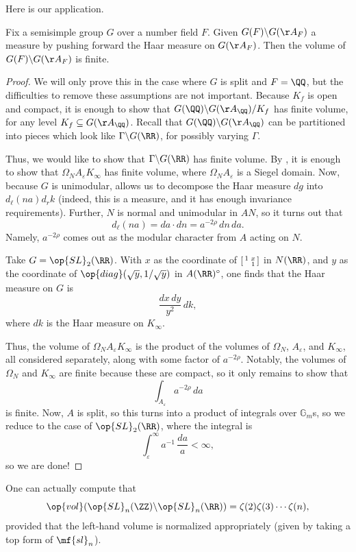 \documentclass[../notes.tex]{subfiles}
\begin{document}
Here is our application.
\begin{theorem}
	Fix a semisimple group $G$ over a number field $F$. Given $G(F)\backslash G(\AA_F)$ a measure by pushing forward the Haar measure on $G(\AA_F)$. Then the volume of $G(F)\backslash G(\AA_F)$ is finite.
\end{theorem}
\begin{proof}
	We will only prove this in the case where $G$ is split and $F=\QQ$, but the difficulties to remove these assumptions are not important. Because $K_f$ is open and compact, it is enough to show that $G(\QQ)\backslash G(\AA_\QQ)/K_f$ has finite volume, for any level $K_f\subseteq G(\AA_\QQ)$. Recall that $G(\QQ)\backslash G(\AA_\QQ)$ can be partitioned into pieces which look like $\Gamma\backslash G(\RR)$, for possibly varying $\Gamma$.

	Thus, we would like to show that $\Gamma\backslash G(\RR)$ has finite volume. By , it is enough to show that $\Omega_NA_\varepsilon K_\infty$ has finite volume, where $\Omega_NA_\varepsilon$ is a Siegel domain. Now, because $G$ is unimodular,  allows us to decompose the Haar measure $dg$ into $d_\ell(na)d_rk$ (indeed, this is a measure, and it has enough invariance requirements). Further, $N$ is normal and unimodular in $AN$, so it turns out that
	\[d_\ell(na)=da\cdot dn=a^{-2\rho}\,dn\,da.\]
	Namely, $a^{-2\rho}$ comes out as the modular character from $A$ acting on $N$.
	\begin{example}
		Take $G=\op{SL}_2(\RR)$. With $x$ as the coordinate of $\begin{bsmallmatrix}
			1 & x \\ & 1
		\end{bsmallmatrix}$ in $N(\RR)$, and $y$ as the coordinate of $\op{diag}(\sqrt y,1/\sqrt y)$ in $A(\RR)^\circ$, one finds that the Haar measure on $G$ is
		\[\frac{dx\,dy}{y^2}\,dk,\]
		where $dk$ is the Haar measure on $K_\infty$.
	\end{example}
	Thus, the volume of $\Omega_NA_\varepsilon K_\infty$ is the product of the volumes of $\Omega_N$, $A_\varepsilon$, and $K_\infty$, all considered separately, along with some factor of $a^{-2\rho}$. Notably, the volumes of $\Omega_N$ and $K_\infty$ are finite because these are compact, so it only remains to show that
	\[\int_{A_\varepsilon}a^{-2\rho}\,da\]
	is finite. Now, $A$ is split, so this turns into a product of integrals over $\mathbb G_m$s, so we reduce to the case of $\op{SL}_2(\RR)$, where the integral is
	\[\int_\varepsilon^\infty a^{-1}\,\frac{da}a<\infty,\]
	so we are done!
\end{proof}
\begin{example}
	One can actually compute that
	\[\op{vol}(\op{SL}_n(\ZZ)\backslash\op{SL}_n(\RR))=\zeta(2)\zeta(3)\cdots\zeta(n),\]
	provided that the left-hand volume is normalized appropriately (given by taking a top form of $\mf{sl}_n$).
\end{example}
\end{document}

